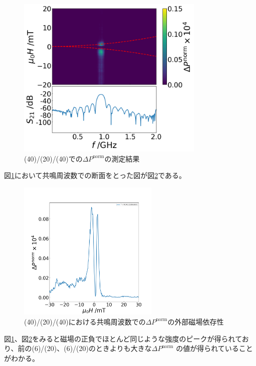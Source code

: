 \documentclass[dvipdfmx,11pt]{jsreport}
\numberwithin{equation}{chapter}
\numberwithin{table}{chapter}
\begin{document}
\begin{figure}[H]
	\centering
	\includegraphics[width=0.80\textwidth]{figdata/ptpymnp.png}
	\caption{(40)/(20)/(40)での$\Delta P^{\text{norm}}$の測定結果}
	\label{fig:ptpymnp}
\end{figure}
図\ref{fig:ptpymnp}において共鳴周波数での断面をとった図が図\ref{fig:ptpymnd}である。
\begin{figure}[H]
	\centering
	\includegraphics[width=0.6\textwidth]{figdata/ptpymn17-1danmen.png}
	\caption{\normalsize{(40)/(20)/(40)における共鳴周波数での$\Delta P^{\text{norm}}$の外部磁場依存性}}
	\label{fig:ptpymnd}
\end{figure}
図\ref{fig:ptpymnp}、図\ref{fig:ptpymnd}をみると磁場の正負でほとんど同じような強度のピークが得られており、前の(6)/(20)、(6)/(20)のときよりも大きな$\Delta P^{\text{norm}}$ の値が得られていることがわかる。
\end{document}
